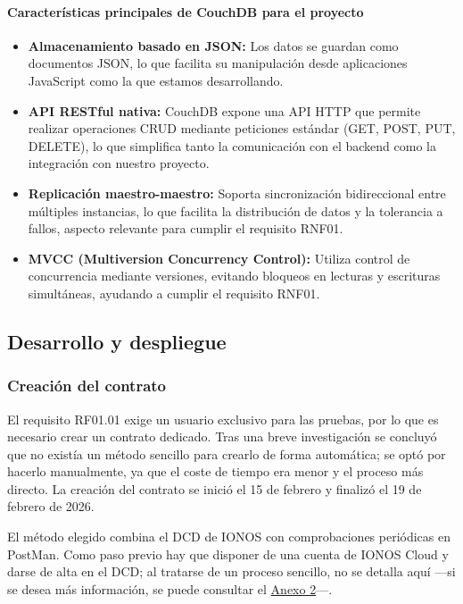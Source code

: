 \paragraph{Características principales de CouchDB para el proyecto}

\begin{itemize}
    \item \textbf{Almacenamiento basado en JSON:} Los datos se guardan como documentos JSON, lo que
          facilita su manipulación desde aplicaciones JavaScript como la que estamos desarrollando.

    \item \textbf{API RESTful nativa:} CouchDB expone una API HTTP que permite realizar operaciones
          CRUD mediante peticiones estándar (GET, POST, PUT, DELETE), lo que simplifica tanto la comunicación con
          el backend como la integración con nuestro proyecto.

    \item \textbf{Replicación maestro-maestro:} Soporta sincronización bidireccional entre múltiples
          instancias, lo que facilita la distribución de datos y la tolerancia a fallos, aspecto relevante para cumplir el requisito RNF01.

    \item \textbf{MVCC (Multiversion Concurrency Control):} Utiliza control de concurrencia mediante
          versiones, evitando bloqueos en lecturas y escrituras simultáneas, ayudando a cumplir el requisito RNF01.
\end{itemize}




\subsection{Desarrollo y despliegue}

\subsubsection{Creación del contrato}
El requisito RF01.01 exige un usuario exclusivo para las pruebas, por lo que es necesario crear un contrato dedicado. Tras una breve investigación se concluyó que no existía un método sencillo para crearlo de forma automática; se optó por hacerlo manualmente, ya que el coste de tiempo era menor y el proceso más directo. La creación del contrato se inició el 15 de febrero y finalizó el 19 de febrero de 2026.

El método elegido combina el DCD de IONOS con comprobaciones periódicas en PostMan. Como paso previo hay que disponer de una cuenta de IONOS Cloud y darse de alta en el DCD; al tratarse de un proceso sencillo, no se detalla aquí ---si se desea más información, se puede consultar el \hyperref[anexo:crear-cuenta-token]{Anexo 2}---.


